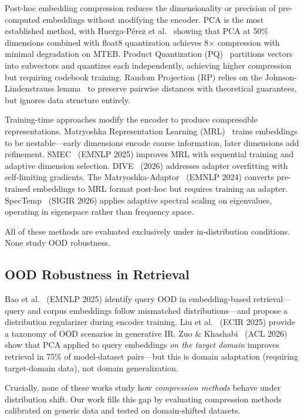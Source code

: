\documentclass[sigconf]{acmart}
\begin{document}
Post-hoc embedding compression reduces the dimensionality or precision of pre-computed embeddings without modifying the encoder. PCA is the most established method, with Huerga-P\'erez et al.~\cite{huerga2025rag} showing that PCA at 50\% dimensions combined with float8 quantization achieves 8$\times$ compression with minimal degradation on MTEB. Product Quantization (PQ)~\cite{johnson2019faiss} partitions vectors into subvectors and quantizes each independently, achieving higher compression but requiring codebook training. Random Projection (RP) relies on the Johnson-Lindenstrauss lemma~\cite{johnson1984extensions} to preserve pairwise distances with theoretical guarantees, but ignores data structure entirely.

Training-time approaches modify the encoder to produce compressible representations. Matryoshka Representation Learning (MRL)~\cite{kusupati2022matryoshka} trains embeddings to be nestable---early dimensions encode coarse information, later dimensions add refinement. SMEC~\cite{zhang2025smec} (EMNLP 2025) improves MRL with sequential training and adaptive dimension selection. DIVE~\cite{zhao2026dive} (2026) addresses adapter overfitting with self-limiting gradients. The Matryoshka-Adaptor~\cite{yoon2024matryoshka} (EMNLP 2024) converts pre-trained embeddings to MRL format post-hoc but requires training an adapter. SpecTemp~\cite{li2026spectemp} (SIGIR 2026) applies adaptive spectral scaling on eigenvalues, operating in eigenspace rather than frequency space.

All of these methods are evaluated exclusively under in-distribution conditions. None study OOD robustness.

\subsection{OOD Robustness in Retrieval}

Bao et al.~\cite{bao2025ood} (EMNLP 2025) identify query OOD in embedding-based retrieval---query and corpus embeddings follow mismatched distributions---and propose a distribution regularizer during encoder training. Liu et al.~\cite{liu2025robust} (ECIR 2025) provide a taxonomy of OOD scenarios in generative IR. Zuo \& Khashabi~\cite{zuo2026compression} (ACL 2026) show that PCA applied to query embeddings \emph{on the target domain} improves retrieval in 75\% of model-dataset pairs---but this is domain adaptation (requiring target-domain data), not domain generalization.

Crucially, none of these works study how \emph{compression methods} behave under distribution shift. Our work fills this gap by evaluating compression methods calibrated on generic data and tested on domain-shifted datasets.
\end{document}
